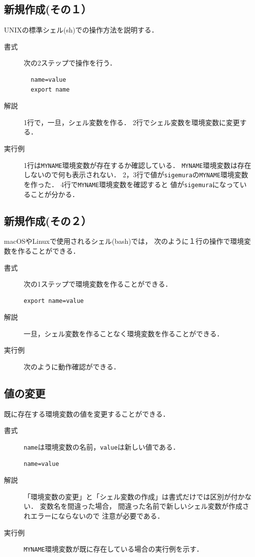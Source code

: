 \subsection{新規作成(その１）}
UNIXの標準シェル(sh)での操作方法を説明する．

\begin{description}
\item[書式] 次の2ステップで操作を行う．
\begin{lstlisting}
  name=value
  export name
\end{lstlisting}
\item[解説]
  1行で，一旦，シェル変数を作る．
  2行でシェル変数を環境変数に変更する．
\item[実行例]
  1行は\texttt{MYNAME}環境変数が存在するか確認している．
  \texttt{MYNAME}環境変数は存在しないので何も表示されない．
  2，3行で値が\texttt{sigemura}の\texttt{MYNAME}環境変数を作った．
  4行で\texttt{MYNAME}環境変数を確認すると
  値が\texttt{sigemura}になっていることが分かる．
  
\end{description}

\subsection{新規作成(その２）}
macOSやLinuxで使用されるシェル(bash)では，
次のように１行の操作で環境変数を作ることができる．

\begin{description}
\item[書式]
  次の1ステップで環境変数を作ることができる．
\begin{lstlisting}[numbers=none]
  export name=value
\end{lstlisting}
\item[解説]
  一旦，シェル変数を作ることなく環境変数を作ることができる．
\item[実行例]
  次のように動作確認ができる．
  
\end{description}

\subsection{値の変更}
既に存在する環境変数の値を変更することができる．

\begin{description}
\item [書式]
  \texttt{name}は環境変数の名前，\texttt{value}は新しい値である．
\begin{lstlisting}[numbers=none]
  name=value
\end{lstlisting}
\item [解説]
  「環境変数の変更」と「シェル変数の作成」は書式だけでは区別が付かない．
  変数名を間違った場合，
  間違った名前で新しいシェル変数が作成されエラーにならないので
  注意が必要である．
\item [実行例]
  \texttt{MYNAME}環境変数が既に存在している場合の実行例を示す．
  
\end{description}

